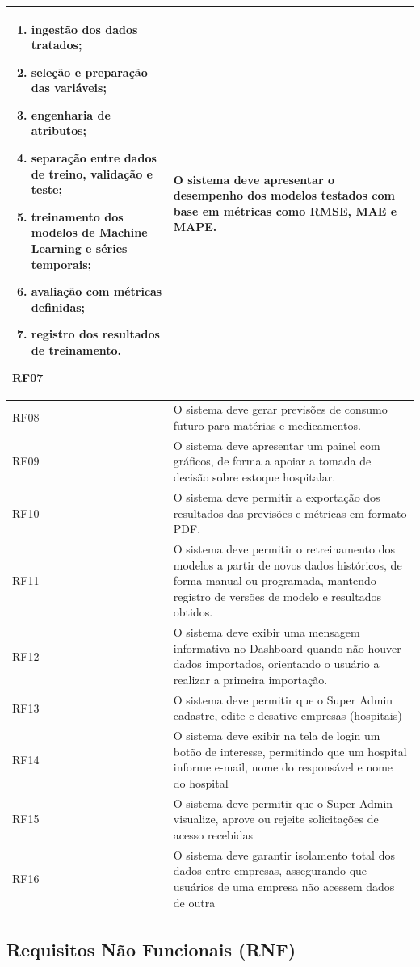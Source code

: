 \documentclass[12pt,a4paper]{article}
\newcommand{\rf}[2]{#1 & #2 \\\midrule}
\begin{document}
\begin{center}
\begin{longtable}{p{} p{}}
{\begin{enumerate}[label=\alph*)]
\item ingestão dos dados tratados;
\item seleção e preparação das variáveis;
\item engenharia de atributos;
\item separação entre dados de treino, validação e teste;
\item treinamento dos modelos de Machine Learning e séries temporais;
\item avaliação com métricas definidas;
\item registro dos resultados de treinamento.
\end{enumerate}
}
\rf{RF07} {O sistema deve apresentar o desempenho dos modelos testados com base em métricas como RMSE, MAE e MAPE.}
\rf{RF08} {O sistema deve gerar previsões de consumo futuro para matérias e medicamentos.}
\rf{RF09} {O sistema deve apresentar um painel com gráficos, de forma a apoiar a tomada de decisão sobre estoque hospitalar.}
\rf{RF10} {O sistema deve permitir a exportação dos resultados das previsões e métricas em formato PDF.}
\rf{RF11}{O sistema deve permitir o retreinamento dos modelos a partir de novos dados históricos, de forma manual ou programada, mantendo registro de versões de modelo e resultados obtidos.}
\rf{RF12}{O sistema deve exibir uma mensagem informativa no Dashboard quando não houver dados importados, orientando o usuário a realizar a primeira importação.}
\rf{RF13}{O sistema deve permitir que o Super Admin cadastre, edite e desative empresas (hospitais)}
\rf{RF14}{O sistema deve exibir na tela de login um botão de interesse, permitindo que um hospital informe e-mail, nome do responsável e nome do hospital}
\rf{RF15}{O sistema deve permitir que o Super Admin visualize, aprove ou rejeite solicitações de acesso recebidas}
\rf{RF16}{O sistema deve garantir isolamento total dos dados entre empresas, assegurando que usuários de uma empresa não acessem dados de outra}
\bottomrule
\end{longtable}
\end{center}

\subsection{Requisitos Não Funcionais (RNF)}
\end{document}
